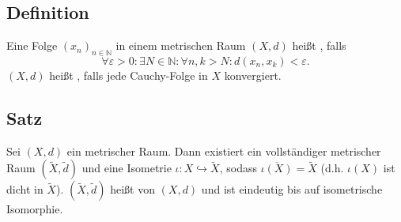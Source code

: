 \subsection[Definition: Cauchy-Folge und Vollständigkeit]{Definition} %
\label{sub:14}
Eine Folge $(x_n)_{n \in \mathds{N}}$ in einem metrischen Raum $(X,d)$ heißt , falls
\[
	\forall \varepsilon>0 : \exists N \in \mathds{N} : \forall n,k >N : d(x_n,x_k) < \varepsilon.
\]
$(X,d)$ heißt , falls jede Cauchy-Folge in $X$ konvergiert. 

\subsection[Satz: Existenz einer eindeutigen Vervollständigung metrischer Räume]{Satz} %
\label{sub:15}
Sei $(X,d)$ ein metrischer Raum. Dann existiert ein vollständiger metrischer Raum $(\tilde{X}, \tilde{d})$ und eine Isometrie $\iota : X \hookrightarrow \tilde{X}$, sodass
$\overline{\iota(X)} = \tilde{X}$ (d.h. $\iota(X)$ ist dicht in $\tilde{X}$). $(\tilde{X}, \tilde{d})$ heißt  von $(X,d)$ und ist eindeutig bis auf
isometrische Isomorphie.
